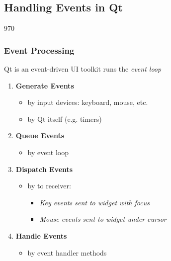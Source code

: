 %
%
%
%

\subsection{Handling Events in Qt}

\begin{slide}{970}
\frametitle{Event Processing}
\label{events_introduction}

\begin{block}{Qt is an event-driven UI toolkit}
 runs the \textit{event loop}
\end{block}
\begin{enumerate}
\item \textbf{Generate Events}
  \begin{itemize}
  \item by input devices: keyboard, mouse, etc.
  \item by Qt itself (e.g. timers)
  \end{itemize}
\item \textbf{Queue Events}
  \begin{itemize}
  \item by event loop
  \end{itemize}
\item \textbf{Dispatch Events}
  \begin{itemize}
  \item by  to receiver: 
    \begin{itemize}
    \item \textit{Key events sent to widget with focus}
    \item \textit{Mouse events sent to widget under cursor}
    \end{itemize}
 \end{itemize}
\item \textbf{Handle Events}
  \begin{itemize}
  \item by  event handler methods
  \end{itemize}
\end{enumerate}
\end{slide}

